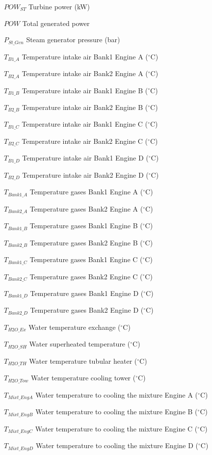 \documentclass[preprint,12pt,authoryear]{elsarticle}
\begin{document}
\par $POW_{ST}$	Turbine power (kW)
\par $POW$		Total generated power
\par $P_{St\_Gen}$	Steam generator pressure (bar)
\par $T_{B1\_A}$	Temperature intake air Bank1 Engine A ($^{\circ}$C) 
\par $T_{B2\_A}$	Temperature intake air Bank2 Engine A ($^{\circ}$C) 
\par $T_{B1\_B}$	Temperature intake air Bank1 Engine B ($^{\circ}$C) 
\par $T_{B2\_B}$	Temperature intake air Bank2 Engine B ($^{\circ}$C) 
\par $T_{B1\_C}$	Temperature intake air Bank1 Engine C ($^{\circ}$C) 
\par $T_{B2\_C}$	Temperature intake air Bank2 Engine C ($^{\circ}$C) 
\par $T_{B1\_D}$	Temperature intake air Bank1 Engine D ($^{\circ}$C) 
\par $T_{B2\_D}$	Temperature intake air Bank2 Engine D ($^{\circ}$C) 
\par $T_{Bank1\_A}$	Temperature gases Bank1 Engine A ($^{\circ}$C) 
\par $T_{Bank2\_A}$	Temperature gases Bank2 Engine A ($^{\circ}$C) 
\par $T_{Bank1\_B}$	Temperature gases Bank1 Engine B ($^{\circ}$C) 
\par $T_{Bank2\_B}$	Temperature gases Bank2 Engine B ($^{\circ}$C) 
\par $T_{Bank1\_C}$	Temperature gases Bank1 Engine C ($^{\circ}$C) 
\par $T_{Bank2\_C}$	Temperature gases Bank2 Engine C ($^{\circ}$C) 
\par $T_{Bank1\_D}$	Temperature gases Bank1 Engine D ($^{\circ}$C) 
\par $T_{Bank2\_D}$	Temperature gases Bank2 Engine D ($^{\circ}$C) 
\par $T_{H2O\_Ex}$	Water temperature exchange ($^{\circ}$C) 
\par $T_{H2O\_SH}$	Water superheated temperature ($^{\circ}$C) 
\par $T_{H2O\_TH}$	Water temperature tubular heater ($^{\circ}$C) 
\par $T_{H2O\_Tow}$	Water temperature cooling tower ($^{\circ}$C) 
\par $T_{Mixt\_EngA}$	Water temperature to cooling the mixture Engine A ($^{\circ}$C) 
\par $T_{Mixt\_EngB}$	Water temperature to cooling the mixture Engine B ($^{\circ}$C)  
\par $T_{Mixt\_EngC}$	Water temperature to cooling the mixture Engine C ($^{\circ}$C)  
\par $T_{Mixt\_EngD}$	Water temperature to cooling the mixture Engine D ($^{\circ}$C)

\FloatBarrier
 



\end{document}
